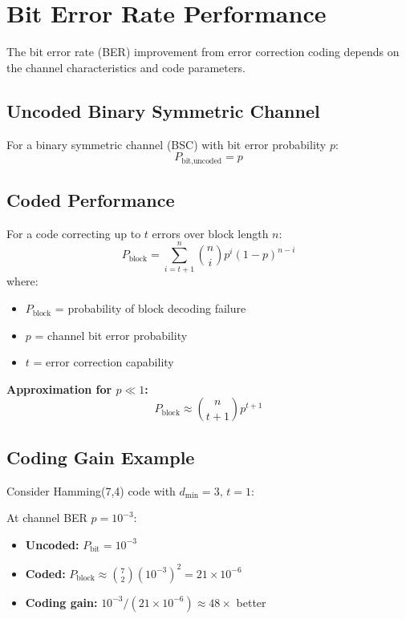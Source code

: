 \section{Bit Error Rate Performance}

The bit error rate (BER) improvement from error correction coding depends on the channel characteristics and code parameters.

\subsection{Uncoded Binary Symmetric Channel}

For a binary symmetric channel (BSC) with bit error probability $p$:
\begin{equation}
P_{\text{bit,uncoded}} = p
\label{eq:ber-uncoded}
\end{equation}

\subsection{Coded Performance}

For a code correcting up to $t$ errors over block length $n$:
\begin{equation}
P_{\text{block}} = \sum_{i=t+1}^{n} \binom{n}{i} p^i (1-p)^{n-i}
\label{eq:block-error}
\end{equation}
where:
\begin{itemize}
\item $P_{\text{block}}$ = probability of block decoding failure
\item $p$ = channel bit error probability
\item $t$ = error correction capability
\end{itemize}

\textbf{Approximation for $p \ll 1$:}
\begin{equation}
P_{\text{block}} \approx \binom{n}{t+1} p^{t+1}
\label{eq:block-error-approx}
\end{equation}

\subsection{Coding Gain Example}

Consider Hamming(7,4) code with $d_{\min} = 3$, $t = 1$:

At channel BER $p = 10^{-3}$:
\begin{itemize}
\item \textbf{Uncoded:} $P_{\text{bit}} = 10^{-3}$
\item \textbf{Coded:} $P_{\text{block}} \approx \binom{7}{2} (10^{-3})^2 = 21 \times 10^{-6}$
\item \textbf{Coding gain:} $10^{-3} / (21 \times 10^{-6}) \approx 48\times$ better
\end{itemize}

